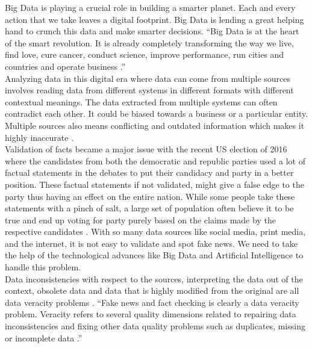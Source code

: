 \documentclass[sigconf]{acmart}
\begin{document}
Big Data is playing a crucial role in building a smarter planet. Each and every action that we take leaves a digital footprint. Big Data is lending a great helping hand to crunch this data and make smarter decisions. ``Big Data is at the heart of the smart revolution. It is already completely transforming the way we live, find love, cure cancer, conduct science, improve performance, run cities and countries and operate business \cite{Marr2015}.''  \\
Analyzing data in this digital era where data can come from multiple sources involves reading data from different systems in different formats with different contextual meanings. The data extracted from multiple systems can often contradict each other. It could be biased towards a business or a particular entity. Multiple sources also means conflicting and outdated information which makes it highly inaccurate \cite{Berti-Equille2016}. \\
Validation of facts became a major issue with the recent US election of 2016 where the candidates from both the democratic and republic parties used a lot of factual statements in the debates to put their candidacy and party in a better position. These factual statements if not validated, might give a false edge to the party thus having an effect on the entire nation. While some people take these statements with a pinch of salt, a large set of population often believe it to be true and end up voting for party purely based on the claims made by the respective candidates \cite{www-forbes2}. With so many data sources like social media, print media, and the internet, it is not easy to validate and spot fake news. We need to take the help of the technological advances like Big Data and Artificial Intelligence to handle this problem.\\ 
Data inconsistencies with respect to the sources, interpreting the data out of the context, obsolete data and data that is highly modified from the original are all data veracity problems \cite{Berti-Equille2016}. ``Fake news and fact checking is clearly a data veracity problem. Veracity refers to several quality dimensions related to repairing data inconsistencies and fixing other data quality problems such as duplicates, missing or incomplete data \cite{Berti-Equille2016}.''
\end{document}
